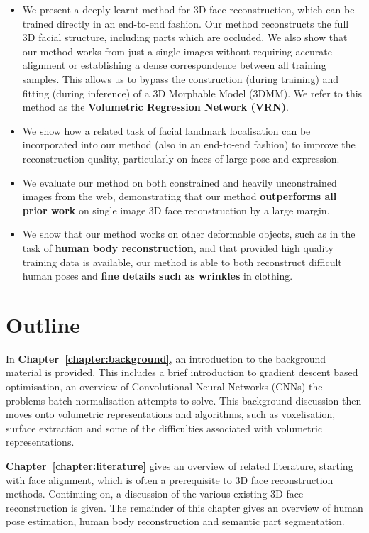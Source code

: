 \begin{itemize}
\item %
  We present a deeply learnt method for 3D face reconstruction, which
  can be trained directly in an end-to-end fashion. Our method
  reconstructs the full 3D facial structure, including parts which are
  occluded. We also show that our method works from just a single
  images without requiring accurate alignment or establishing a dense
  correspondence between all training samples.  This allows us to
  bypass the construction (during training) and fitting (during
  inference) of a 3D Morphable Model (3DMM).  We refer to this method
  as the \textbf{Volumetric Regression Network (VRN)}.

\item We show how a related task of facial landmark localisation can
  be incorporated into our method (also in an end-to-end fashion) to
  improve the reconstruction quality, particularly on faces of large
  pose and expression.

\item We evaluate our method on both constrained and heavily
  unconstrained images from the web, demonstrating that our method
  \textbf{outperforms all prior work} on single image 3D face
  reconstruction by a large margin.

\item We show that our method works on other deformable objects, such
  as in the task of \textbf{human body reconstruction}, and that
  provided high quality training data is available, our method is able
  to both reconstruct difficult human poses and \textbf{fine details
    such as wrinkles} in clothing.
\end{itemize}

\section{Outline}

In \textbf{Chapter~\ref{chapter:background}}, an introduction to the
background material is provided. This includes a brief introduction to
gradient descent based optimisation, an overview of Convolutional
Neural Networks (CNNs) the problems batch normalisation attempts to
solve. This background discussion then moves onto volumetric
representations and algorithms, such as voxelisation, surface
extraction and some of the difficulties associated with volumetric
representations.

\textbf{Chapter~\ref{chapter:literature}} gives an overview of related
literature, starting with face alignment, which is often a
prerequisite to 3D face reconstruction methods. Continuing on, a
discussion of the various existing 3D face reconstruction is
given. The remainder of this chapter gives an overview of human pose
estimation, human body reconstruction and semantic part segmentation.


